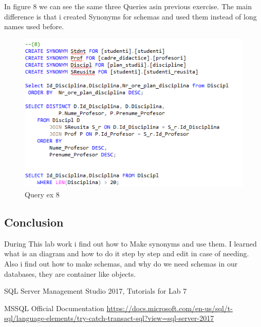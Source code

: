 \documentclass[12pt]{article}
\begin{document}
        In figure 8 we can see the same three Queries asin previous exercise. The main difference is that i created Synonyms for schemas and used them instead of long names used before. 
        \begin{figure}[H]
                \centering
                \includegraphics[width=\textwidth]{img8.png}
                \caption{Query ex 8}
        \end{figure}
        \vspace{0.5 cm}
   
        \newpage 
        \subsection*{Conclusion}
        During This lab work i find out how to Make synonyms and use them. I learned what is an diagram and how to do it step by step and edit in case of needing. Also i find out how to make schemas, and why do we need schemas in our databases, they are container like objects. 
        \cite{SQLServerManagementStudio}
        

 
\medskip
 
\begin{thebibliography}{9}
SQL Server Management Studio 2017, Tutorials for Lab 7

MSSQL Official Documentation
\url{https://docs.microsoft.com/en-us/sql/t-sql/language-elements/try-catch-transact-sql?view=sql-server-2017}
\end{thebibliography}
                
\end{document}
